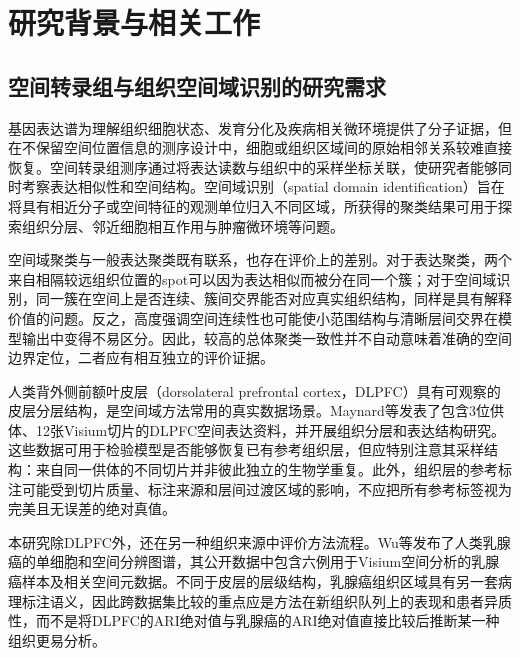 \section{研究背景与相关工作}
\label{sec:cc-background-rewrite-v1}

\subsection{空间转录组与组织空间域识别的研究需求}
\label{subsec:cc-st-background-v1}

基因表达谱为理解组织细胞状态、发育分化及疾病相关微环境提供了分子证据，但在不保留空间位置信息的测序设计中，细胞或组织区域间的原始相邻关系较难直接恢复。空间转录组测序通过将表达读数与组织中的采样坐标关联，使研究者能够同时考察表达相似性和空间结构。空间域识别（spatial domain identification）旨在将具有相近分子或空间特征的观测单位归入不同区域，所获得的聚类结果可用于探索组织分层、邻近细胞相互作用与肿瘤微环境等问题。

空间域聚类与一般表达聚类既有联系，也存在评价上的差别。对于表达聚类，两个来自相隔较远组织位置的spot可以因为表达相似而被分在同一个簇；对于空间域识别，同一簇在空间上是否连续、簇间交界能否对应真实组织结构，同样是具有解释价值的问题。反之，高度强调空间连续性也可能使小范围结构与清晰层间交界在模型输出中变得不易区分。因此，较高的总体聚类一致性并不自动意味着准确的空间边界定位，二者应有相互独立的评价证据。

人类背外侧前额叶皮层（dorsolateral prefrontal cortex，DLPFC）具有可观察的皮层分层结构，是空间域方法常用的真实数据场景。Maynard等发表了包含3位供体、12张Visium切片的DLPFC空间表达资料，并开展组织分层和表达结构研究\cite{maynard2021}。这些数据可用于检验模型是否能够恢复已有参考组织层，但应特别注意其采样结构：来自同一供体的不同切片并非彼此独立的生物学重复。此外，组织层的参考标注可能受到切片质量、标注来源和层间过渡区域的影响，不应把所有参考标签视为完美且无误差的绝对真值。

本研究除DLPFC外，还在另一种组织来源中评价方法流程。Wu等发布了人类乳腺癌的单细胞和空间分辨图谱，其公开数据中包含六例用于Visium空间分析的乳腺癌样本及相关空间元数据\cite{wu2021}。不同于皮层的层级结构，乳腺癌组织区域具有另一套病理标注语义，因此跨数据集比较的重点应是方法在新组织队列上的表现和患者异质性，而不是将DLPFC的ARI绝对值与乳腺癌的ARI绝对值直接比较后推断某一种组织更易分析。

